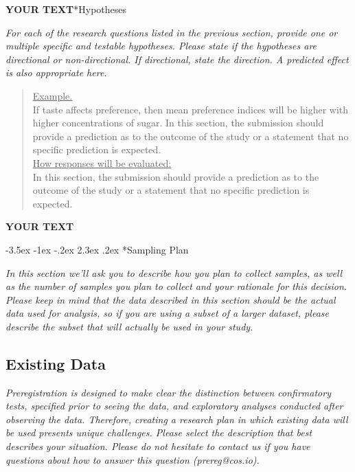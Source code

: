 \documentclass{article}
\makeatletter
\newcommand{\example}[2]{\vspace{-0.3cm}\begin{quote}\underline{Example.}\\#1\ifx#2\undefined \else \\[0.2cm]\underline{How responses will be evaluated:}\\#2\fi\\\end{quote}}
\newcommand{\yourtext}[1]{\noindent\textbf{\color{red}YOUR TEXT}}
\renewcommand{\section}{\@startsection {section}{1}{\z@}%
	{-3.5ex \@plus -1ex \@minus -.2ex}%
	{2.3ex \@plus .2ex}%
	{\normalfont\LARGE\bfseries}}
\makeatother
\begin{document}
	\yourtext
	
	\subsection*{Hypotheses}
	
	\ifx\hidehints\undefined
	
	\textit{%
		For each of the research questions listed in the previous section, provide one or multiple specific and testable hypotheses. Please state if the hypotheses are directional or non-directional. If directional, state the direction. A predicted effect is also appropriate here.
	}\\
	
	\example{
		If taste affects preference, then mean preference indices will be higher with higher concentrations of sugar.}{		
		In this section, the submission should provide a prediction as to the outcome of the study or a statement that no specific prediction is expected.
	}
	\fi
	
	\yourtext

\newpage

\section*{Sampling Plan}

	\ifx\hidehints\undefined
	\textit{In this section we’ll ask you to describe how you plan to collect samples, as well as the number of samples you plan to collect and your rationale for this decision. Please keep in mind that the data described in this section should be the actual data used for analysis, so if you are using a subset of a larger dataset, please describe the subset that will actually be used in your study.}
	\fi

	\subsection*{Existing Data}
	
	\ifx\hidehints\undefined
	
	\textit{%
		Preregistration is designed to make clear the distinction between confirmatory tests, specified prior to seeing the data, and exploratory analyses conducted after observing the data. Therefore, creating a research plan in which existing data will be used presents unique challenges. Please select the description that best describes your situation. Please do not hesitate to contact us if you have questions about how to answer this question (prereg@cos.io).
	}\\
	
\end{document}
